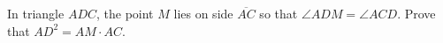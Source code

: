 In triangle $ADC$, the point $M$ lies on side $\overline{AC}$ so that $\angle ADM=\angle ACD$. Prove that $AD^2=AM\cdot AC$.
